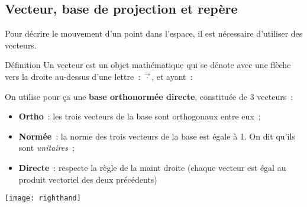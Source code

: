 \documentclass[../main/main.tex]{subfiles}
\begin{document}
\subsection{Vecteur, base de projection et repère}
Pour décrire le mouvement d'un point dans l'espace, il est nécessaire d'utiliser
des vecteurs.
\begin{bdefi}{Définition}
    Un vecteur est un objet mathématique qui se dénote avec une flèche vers la
    droite au-dessus d'une lettre~: $\vec{\cdot}$, et ayant~:\smallbreak
    \begin{framed}
        \centering
        \vspace{-12pt}
    \end{framed}
\end{bdefi}

On utilise pour ça une \textbf{base orthonormée directe}, constituée de 3
vecteurs~:

\begin{minipage}{0.70\linewidth}
    \begin{itemize}
        \item \textbf{Ortho}~: les trois vecteurs de la base sont orthogonaux
            entre eux~;
        \item \textbf{Normée}~: la norme des trois vecteurs de la base est égale
            à 1. On dit qu'ils sont \textit{unitaires}~;
        \item \textbf{Directe}~: respecte la règle de la maint droite (chaque
            vecteur est égal au produit vectoriel des deux précédents) 
    \end{itemize}
\end{minipage}
\hfill
\begin{minipage}{0.20\linewidth}
    \begin{center}
        \texttt{[image: righthand]}
    \end{center}
\end{minipage}
\hfill~
\end{document}
